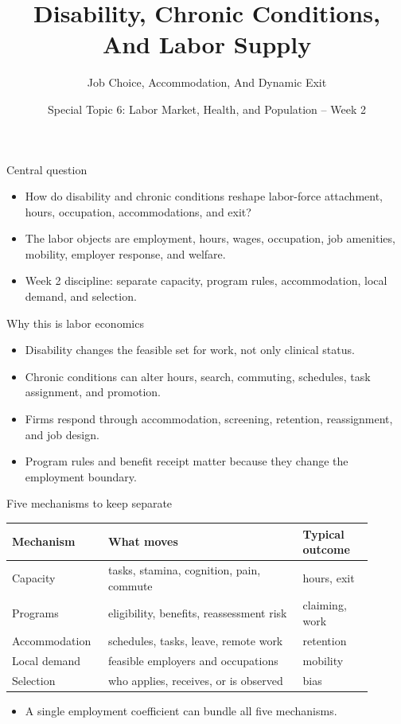 \documentclass[aspectratio=169,11pt]{beamer}
\title{Disability, Chronic Conditions, And Labor Supply}
\subtitle{Job Choice, Accommodation, And Dynamic Exit}
\author{Special Topic 6: Labor Market, Health, and Population -- Week 2}
\date{}
\begin{document}
\begin{frame}
  \titlepage
\end{frame}

\begin{frame}{Central question}
\begin{itemize}
    \item How do disability and chronic conditions reshape labor-force attachment, hours, occupation, accommodations, and exit?
    \item The labor objects are employment, hours, wages, occupation, job amenities, mobility, employer response, and welfare.
    \item Week 2 discipline: separate capacity, program rules, accommodation, local demand, and selection.
\end{itemize}
\end{frame}

\begin{frame}{Why this is labor economics}
\begin{itemize}
    \item Disability changes the feasible set for work, not only clinical status.
    \item Chronic conditions can alter hours, search, commuting, schedules, task assignment, and promotion.
    \item Firms respond through accommodation, screening, retention, reassignment, and job design.
    \item Program rules and benefit receipt matter because they change the employment boundary.
\end{itemize}
\end{frame}

\begin{frame}{Five mechanisms to keep separate}
\small
\begin{tabular}{p{0.22\linewidth} p{0.50\linewidth} p{0.18\linewidth}}
\toprule
Mechanism & What moves & Typical outcome \\
\midrule
Capacity & tasks, stamina, cognition, pain, commute & hours, exit \\
Programs & eligibility, benefits, reassessment risk & claiming, work \\
Accommodation & schedules, tasks, leave, remote work & retention \\
Local demand & feasible employers and occupations & mobility \\
Selection & who applies, receives, or is observed & bias \\
\bottomrule
\end{tabular}
\vspace{0.35cm}
\begin{itemize}
    \item A single employment coefficient can bundle all five mechanisms.
\end{itemize}
\end{frame}
\end{document}
